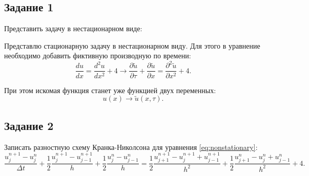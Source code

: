 \documentclass[12pt, a4paper]{report}
\begin{document}
	\subsection*{Задание 1}
	\large
	Представить задачу в нестационарном виде: \par
	Представлю стационарную задачу в нестационарном виду. Для этого в уравнение необходимо добавить фиктивную производную по времени:
	\begin{equation}\label{eq:nonstationary}
		\frac{du}{dx}=\frac{d^{2}u}{dx^{2}}+4 \rightarrow \frac{\partial \tilde{u}}{\partial \tau}+\frac{\partial \tilde{u}}{\partial x}=\frac{\partial^{2} \tilde{u}}{\partial x^{2}}+4.
	\end{equation}
	\par
	При этом искомая функция станет уже функцией двух переменных:
	\begin{equation*}
		u(x) \rightarrow \tilde{u}(x,\tau).
	\end{equation*}
	
	\subsection*{Задание 2}
	\large
	Записать разностную схему Кранка-Николсона для уравнения \eqref{eq:nonstationary}:
	\normalsize
	\begin{equation}\label{eq:crankNicholson}
		\frac{u_{j}^{n+1} - u_{j}^{n}}{\Delta t} + \frac{1}{2}\frac{u_{j}^{n+1} - u_{j-1}^{n+1}}{h} + \frac{1}{2}\frac{u_{j}^{n} - u_{j-1}^{n}}{h} = \frac{1}{2}\frac{u_{j+1}^{n+1} - u_{j}^{n+1} + u_{j-1}^{n+1}}{h^{2}} + \frac{1}{2}\frac{u_{j+1}^{n} - u_{j}^{n} + u_{j-1}^{n}}{h^{2}} + 4.
	\end{equation}
\end{document}

